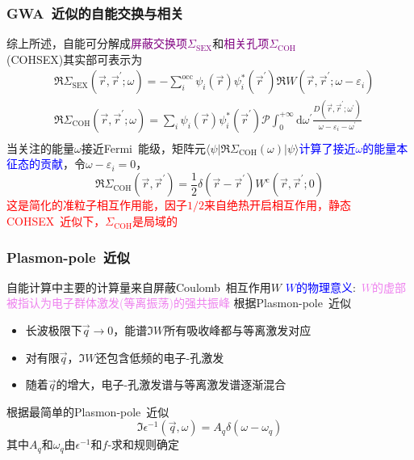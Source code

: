 \documentclass[cjk,slidestop,compress,mathserif,blue]{beamer}
\begin{document}
\frame
{
	\frametitle{\textrm{GWA~}近似的自能交换与相关}
	综上所述，自能可分解成\textcolor{purple}{屏蔽交换项$\Sigma_{\mathrm{SEX}}$}和\textcolor{purple}{相关孔项$\Sigma_{\mathrm{COH}}$}\\(\textrm{COHSEX})其实部可表示为
	\begin{displaymath}
		\begin{aligned}
			&\Re\Sigma_{\mathrm{SEX}}(\vec r,\vec r^{\prime};\omega)=-\sum_i^{\mathrm{occ}}\psi_i(\vec r)\psi_i^{\ast}(\vec r^{\prime})\Re W(\vec r,\vec r^{\prime};\omega-\varepsilon_i)\\
			&\Re\Sigma_{\mathrm{COH}}(\vec r,\vec r^{\prime};\omega)=\sum_i\psi_i(\vec r)\psi_i^{\ast}(\vec r^{\prime})\mathscr{P}\int_0^{+\infty}\mathrm{d}\omega^{\prime}\frac{D(\vec r,\vec r^{\prime};\omega^{\prime})}{\omega-\varepsilon_i-\omega^{\prime}}\\
		\end{aligned}
	\end{displaymath}
	当关注的能量$\omega$接近\textrm{Fermi~}能级，矩阵元$\langle\psi|\Re\Sigma_{\mathrm{COH}}(\omega)|\psi\rangle$\textcolor{blue}{计算了接近$\omega$的能量本征态的贡献}，令$\omega-\varepsilon_i=0$，
	\begin{displaymath}
		\Re\Sigma_{\mathrm{COH}}(\vec r,\vec r^{\prime})=\frac12\delta(\vec r-\vec r^{\prime})W^{\mathrm{c}}(\vec r,\vec r^{\prime};0)
	\end{displaymath}
	\textcolor{red}{这是简化的准粒子相互作用能，因子$1/2$来自绝热开启相互作用，静态\textrm{COHSEX~}近似下，$\Sigma_{\mathrm{COH}}$是局域的}
}

\frame
{
	\frametitle{\textrm{Plasmon-pole~}近似}
	自能计算中主要的计算量来自屏蔽\textrm{Coulomb~}相互作用$W$
	\vskip 3pt
	\textcolor{blue}{$W$的物理意义}:~\textcolor{violet}{$W$的虚部被指认为电子群体激发(等离振荡)的强共振峰}
	\vskip 5pt
	根据\textrm{Plasmon-pole~}近似
	\begin{itemize}
		\item 长波极限下$\vec q\rightarrow0$，能谱$\Im W$所有吸收峰都与等离激发对应
		\item 对有限$\vec q$，$\Im W$还包含低频的电子-孔激发
		\item 随着$\vec q$的增大，电子-孔激发谱与等离激发谱逐渐混合
	\end{itemize}
	根据最简单的\textrm{Plasmon-pole~}近似
	\begin{displaymath}
		\Im\epsilon^{-1}(\vec q,\omega)=A_q\delta(\omega-\omega_q)
	\end{displaymath}
	其中$A_q$和$\omega_q$由$\epsilon^{-1}$和$f$-求和规则确定
}
\end{document}
